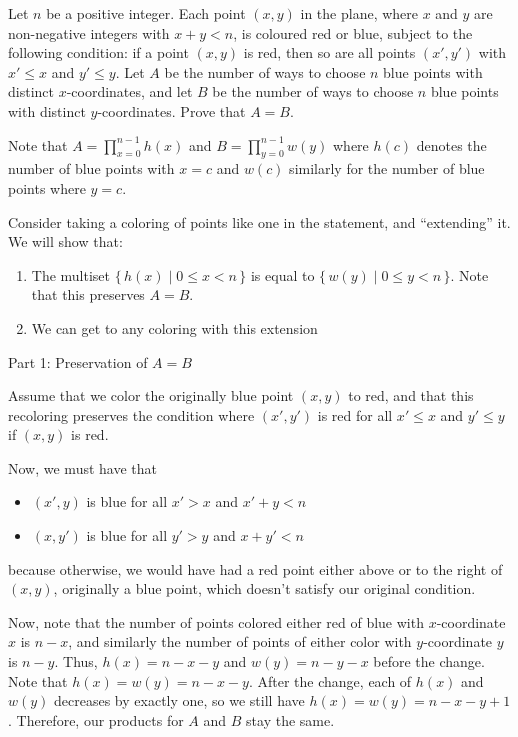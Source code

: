 
\begin{problem}[ISL 2002 C1]
    Let $n$ be a positive integer. Each point $(x,y)$ in the plane, where $x$
    and $y$ are non-negative integers with $x+y<n$, is coloured red or blue,
    subject to the following condition: if a point $(x,y)$ is red, then so are
    all points $(x',y')$ with $x'\leq x$ and $y'\leq y$. Let $A$ be the number
    of ways to choose $n$ blue points with distinct $x$-coordinates, and let
    $B$ be the number of ways to choose $n$ blue points with distinct
    $y$-coordinates. Prove that $A=B$.
\end{problem}

\begin{solution}[Ritwin]
    Note that $A=\prod_{x=0}^{n-1}h(x)$ and $B=\prod_{y=0}^{n-1}w(y)$ where
    $h(c)$ denotes the number of blue points with $x=c$ and $w(c)$ similarly
    for the number of blue points where $y=c$.
    
    Consider taking a coloring of points like one in the statement, and
    ``extending'' it. We will show that:
    \begin{enumerate}[itemsep=-2pt]
      \item The multiset $\{\,h(x) \mid 0\leq x<n\,\}$ is equal to
      $\{\,w(y) \mid 0\leq y<n\,\}$. Note that this preserves $A=B$.
      \item We can get to any coloring with this extension
    \end{enumerate}
    
    \large Part 1: Preservation of $A=B$ \small
    
    Assume that we color the originally blue point $(x,y)$ to red, and that this
    recoloring preserves the condition where $(x',y')$ is red for all $x'\leq x$
    and $y'\leq y$ if $(x,y)$ is red.
    
    Now, we must have that
    \begin{itemize}
      \item $(x',y)$ is blue for all $x'>x$ and $x'+y<n$
      \item $(x,y')$ is blue for all $y'>y$ and $x+y'<n$
    \end{itemize}
    
    because otherwise, we would have had a red point either above or to the right
    of $(x,y)$, originally a blue point, which doesn't satisfy our original condition.
    
    Now, note that the number of points colored either red of blue with
    $x$-coordinate $x$ is $n-x$, and similarly the number of points of either
    color with $y$-coordinate $y$ is $n-y$. Thus, $h(x) = n-x-y$ and $w(y) = n-y-x$
    before the change. Note that $h(x)=w(y)=n-x-y$. After the change, each of
    $h(x)$ and $w(y)$ decreases by exactly one, so we still have $h(x)=w(y)=n-x-y+1$.
    Therefore, our products for $A$ and $B$ stay the same.
    

\end{solution}
